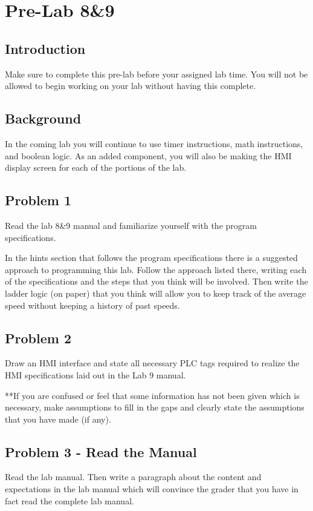 \chapter{Pre-Lab 8\&9}
\setcounter{TASignatures}{0}
\setcounter{AsideCounter}{0}

\section{Introduction}

Make sure to complete this pre-lab before your assigned lab time. You will not be allowed to begin working on your lab without having this complete.

\section{Background}


In the coming lab you will continue to use timer instructions, math instructions, and boolean logic. As an added component, you will also be making the HMI display screen for each of the portions of the lab. 


\section{Problem 1}
Read the lab 8\&9 manual and familiarize yourself with the program specifications. 

In the hints section that follows the program specifications there is a suggested approach to programming this lab. Follow the approach listed there, writing each of the specifications and the steps that you think will be involved. Then write the ladder logic (on paper) that you think will allow you to keep track of the average speed without keeping a history of past speeds. 


\section{Problem 2}

Draw an HMI interface and state all necessary PLC tags required to realize the HMI specifications laid out in the Lab 9 manual.

**If you are confused or feel that some information has not been given which is necessary, make assumptions to fill in the gaps and clearly state the assumptions that you have made (if any).

\section{Problem 3 - Read the Manual}

Read the lab manual. Then write a paragraph about the content and expectations in the lab manual which will convince the grader that you have in fact read the complete lab manual.